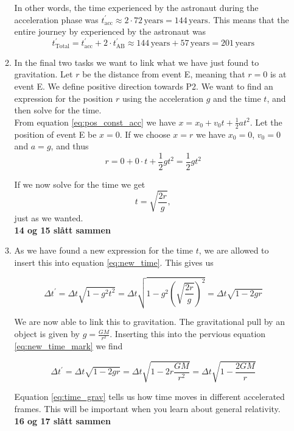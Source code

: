 \documentclass[a4paper,10pt,english]{article}
\begin{document}
\begin{enumerate}
\begin{enumerate}
In other words, the time experienced by the astronaut during the acceleration phase was $t_{\text{acc}}^{\prime}\approx2\cdot72\,\text{years}=144\,\text{years}$. This means that the entire journey by experienced by the astronaut was \[t_{\text{Total}}^{\prime}=t_{\text{acc}}^{\prime}+2\cdot t_{\text{AB}}^{\prime}\approx144\,\text{years}+57\,\text{years}=201\,\text{years}\]


\item In the final two tasks we want to link what we have just found to gravitation. Let $r$ be the distance from event E, meaning that $r=0$ is at event E. We define positive direction towards P2. We want to find an expression for the position $r$ using the acceleration $g$ and the time $t$, and then solve for the time.
\\
From equation \ref{eq:pos_const_acc} we have $x=x_{0}+v_{0}t+\frac{1}{2}at^{2}$. Let the position of event E be $x=0$. If we choose $x=r$ we have $x_{0}=0$, $v_{0}=0$ and $a=g$, and thus
\[r=0+0\cdot t+\frac{1}{2}gt^{2}=\frac{1}{2}gt^{2}\]

If we now solve for the time we get
\[t=\sqrt{\frac{2r}{g}},\]
just as we wanted.
\\
\textbf{14 og 15 slått sammen}
\\

\item As we have found a new expression for the time $t$, we are allowed to insert this into equation \ref{eq:new_time}. This gives us

\begin{equation}\label{eq:new_time_mark}
\Delta t^{\prime}=\Delta t\sqrt{1-g^{2}t^{2}}=\Delta t\sqrt{1-g^{2}\left(\sqrt{\frac{2r}{g}}\right)^{2}}=\Delta t\sqrt{1-2gr}
\end{equation}

We are now able to link this to gravitation. The gravitational pull by an object is given by $g=\frac{GM}{r^{2}}$. Inserting this into the pervious equation \ref{eq:new_time_mark} we find

\begin{equation}\label{eq:time_grav}
\Delta t^{\prime}=\Delta t\sqrt{1-2gr}=\Delta t\sqrt{1-2r\frac{GM}{r^{2}}}=\Delta t\sqrt{1-\frac{2GM}{r}}
\end{equation}

Equation \ref{eq:time_grav} tells us how time moves in different accelerated frames. This will be important when you learn about general relativity.
\\
\textbf{16 og 17 slått sammen}
\\
\end{enumerate}
\end{enumerate}
\end{document}
